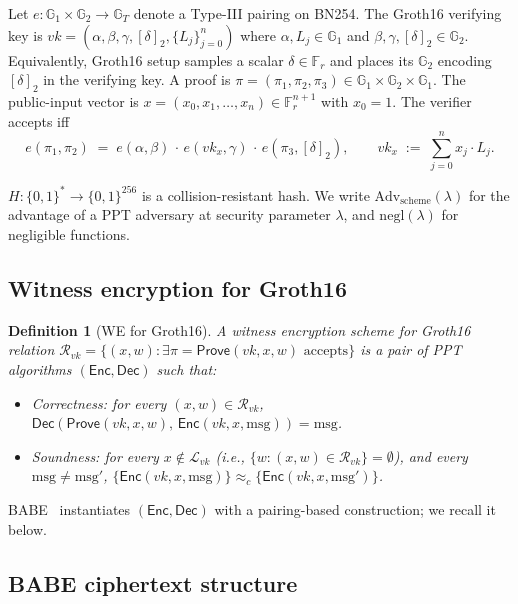 \documentclass[11pt]{article}
\newtheorem{definition}{Definition}
\newcommand{\Gone}{\mathbb{G}_1}
\newcommand{\Gtwo}{\mathbb{G}_2}
\newcommand{\Gt}{\mathbb{G}_T}
\newcommand{\Fr}{\mathbb{F}_r}
\newcommand{\deltatwo}{[\delta]_2}
\newcommand{\msg}{\mathrm{msg}}
\newcommand{\Enc}{\mathsf{Enc}}
\newcommand{\Dec}{\mathsf{Dec}}
\newcommand{\Adv}{\mathrm{Adv}}
\newcommand{\negl}{\mathrm{negl}}
\begin{document}
Let $e : \Gone \times \Gtwo \to \Gt$ denote a Type-III pairing on
BN254. The Groth16 verifying key is
$vk = (\alpha, \beta, \gamma, \deltatwo, \{L_j\}_{j=0}^{n})$ where
$\alpha, L_j \in \Gone$ and $\beta, \gamma, \deltatwo \in \Gtwo$.
Equivalently, Groth16 setup samples a scalar
$\delta \in \Fr$ and places its $\Gtwo$ encoding $\deltatwo$ in the
verifying key. A
proof is $\pi = (\pi_1, \pi_2, \pi_3) \in \Gone \times \Gtwo \times \Gone$.
The public-input vector is $x = (x_0, x_1, \ldots, x_n) \in \Fr^{n+1}$
with $x_0 = 1$. The verifier accepts iff
\begin{equation}
  e(\pi_1, \pi_2) \;=\; e(\alpha, \beta)\,\cdot\,e(vk_x, \gamma)\,\cdot\,e(\pi_3, \deltatwo),
  \qquad vk_x \;:=\; \sum_{j=0}^{n} x_j \cdot L_j.
  \label{eq:g16}
\end{equation}

$H : \{0,1\}^* \to \{0,1\}^{256}$ is a collision-resistant hash. We
write $\Adv_{\mathrm{scheme}}(\lambda)$ for the advantage of a PPT
adversary at security parameter $\lambda$, and $\negl(\lambda)$ for
negligible functions.

\subsection{Witness encryption for Groth16}

\begin{definition}[WE for Groth16]
A witness encryption scheme for Groth16 relation
$\mathcal{R}_{vk} = \{(x, w) : \exists \pi = \mathsf{Prove}(vk, x, w)
\text{ accepts}\}$ is a pair of PPT algorithms $(\Enc, \Dec)$ such
that:
\begin{itemize}
  \item \emph{Correctness:} for every $(x, w) \in \mathcal{R}_{vk}$,
    $\Dec(\mathsf{Prove}(vk, x, w),\, \Enc(vk, x, \msg)) = \msg$.
  \item \emph{Soundness:} for every $x \notin \mathcal{L}_{vk}$ (i.e.,
    $\{w : (x, w) \in \mathcal{R}_{vk}\} = \emptyset$), and every
    $\msg \neq \msg'$,
    $\{\Enc(vk, x, \msg)\} \approx_c \{\Enc(vk, x, \msg')\}$.
\end{itemize}
\end{definition}

BABE~\cite{babe2026} instantiates $(\Enc, \Dec)$ with a pairing-based
construction; we recall it below.

\subsection{BABE ciphertext structure}
\end{document}
